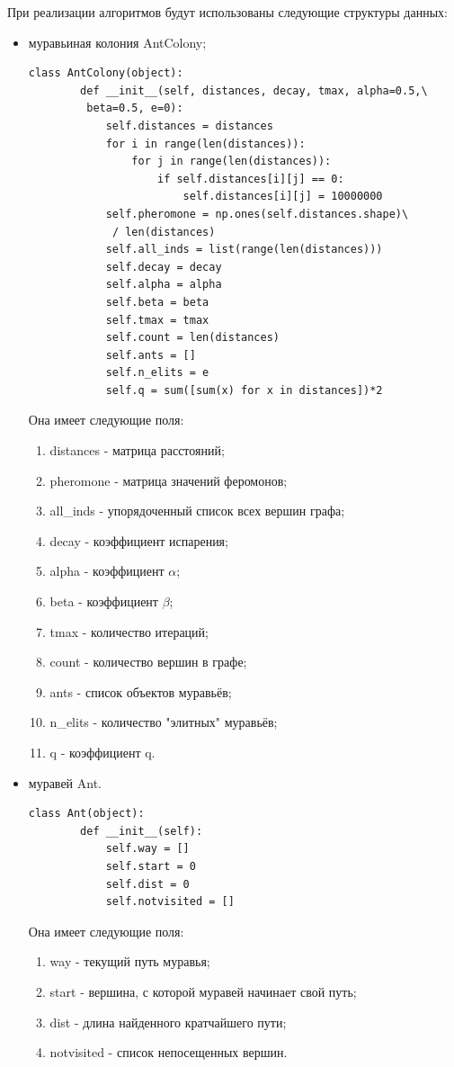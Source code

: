 \captionsetup{singlelinecheck = false, justification=raggedright}
При реализации алгоритмов будут использованы следующие структуры данных:
\begin{itemize}
	\item муравьиная колония AntColony;
	\begin{lstlisting}[caption= Класс AntColony]
	class AntColony(object):
		def __init__(self, distances, decay, tmax, alpha=0.5,\
		 beta=0.5, e=0):
			self.distances = distances
			for i in range(len(distances)):
				for j in range(len(distances)):
					if self.distances[i][j] == 0:
						self.distances[i][j] = 10000000
			self.pheromone = np.ones(self.distances.shape)\
			 / len(distances)
			self.all_inds = list(range(len(distances)))
			self.decay = decay
			self.alpha = alpha
			self.beta = beta
			self.tmax = tmax
			self.count = len(distances)
			self.ants = []
			self.n_elits = e
			self.q = sum([sum(x) for x in distances])*2
	\end{lstlisting}
	Она имеет следующие поля:
	\begin{enumerate}
		\item distances - матрица расстояний;
		\item pheromone - матрица значений феромонов;
		\item all\_inds - упорядоченный список всех вершин графа;
		\item decay - коэффициент испарения;
		\item alpha - коэффициент $\alpha$;
		\item beta - коэффициент $\beta$;
		\item tmax - количество итераций;
		\item count - количество вершин в графе;
		\item ants - список объектов муравьёв;
		\item n\_elits - количество "элитных" муравьёв;
		\item q - коэффициент q.
	\end{enumerate}
	\item муравей Ant.
	\begin{lstlisting}[caption = Класс Ant]
	class Ant(object):
		def __init__(self):
			self.way = []
			self.start = 0
			self.dist = 0
			self.notvisited = []
	\end{lstlisting}
	Она имеет следующие поля:
	\begin{enumerate}
		\item way - текущий путь муравья;
		\item start - вершина, с которой муравей начинает свой путь;
		\item dist - длина найденного кратчайшего пути;
		\item notvisited - список непосещенных вершин.
	\end{enumerate}
\end{itemize}
\captionsetup{singlelinecheck = false, justification=centering}

